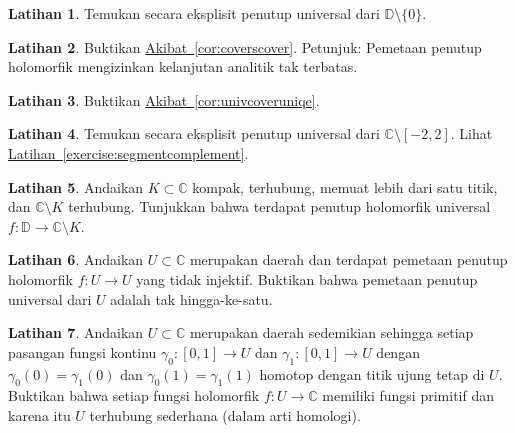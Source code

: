 \documentclass[12pt,openany]{book}
\newcommand{\C}{{\mathbb{C}}}
\newcommand{\D}{{\mathbb{D}}}
\theoremstyle{plain}
\theoremstyle{remark}
\theoremstyle{definition}
\newenvironment{exbox}{%
    \def\FrameCommand{\vrule width 1pt \relax\hspace{10pt}}%
    \MakeFramed{\advance\hsize-\width\FrameRestore}%
}{%
    \endMakeFramed
}
\theoremstyle{exercise}
\newtheorem{exercise}{Latihan}[section]
\theoremstyle{example}
\newcommand{\exerciseref}[1]{\hyperref[#1]{Latihan~\ref*{#1}}}
\newcommand{\corref}[1]{\hyperref[#1]{Akibat~\ref*{#1}}}
\begin{document}
\begin{exbox}
\begin{exercise}
Temukan secara eksplisit penutup universal dari $\D \setminus \{ 0 \}$.
\end{exercise}

\begin{exercise}
Buktikan \corref{cor:coverscover}.  Petunjuk: Pemetaan penutup holomorfik
mengizinkan kelanjutan analitik tak terbatas.
\end{exercise}

\begin{exercise}
Buktikan \corref{cor:univcoveruniqe}.
\end{exercise}

\begin{exercise}
Temukan secara eksplisit penutup universal dari $\C \setminus [-2,2]$.
Lihat \exerciseref{exercise:segmentcomplement}.
\end{exercise}

\begin{exercise}
Andaikan $K \subset \C$ kompak, terhubung, memuat lebih dari satu
titik, dan $\C \setminus K$ terhubung.  Tunjukkan bahwa
terdapat penutup holomorfik universal $f \colon \D \to \C \setminus K$.
\end{exercise}

\begin{exercise}
Andaikan $U \subset \C$ merupakan daerah dan terdapat
pemetaan penutup holomorfik
$f \colon U \to U$ yang tidak injektif.
Buktikan bahwa pemetaan penutup universal dari $U$ adalah tak hingga-ke-satu.
\end{exercise}

\begin{exercise} \label{exercise:EPHimpliesSC}
Andaikan $U \subset \C$ merupakan daerah sedemikian sehingga 
setiap pasangan fungsi kontinu 
$\gamma_0 \colon [0,1] \to U$ dan
$\gamma_1 \colon [0,1] \to U$
dengan
$\gamma_0(0)=\gamma_1(0)$ dan
$\gamma_0(1)=\gamma_1(1)$ homotop dengan titik ujung tetap di $U$.
Buktikan bahwa setiap fungsi holomorfik $f \colon U \to \C$ memiliki fungsi primitif
dan karena itu $U$ terhubung sederhana (dalam arti homologi).
\end{exercise}
\end{exbox}

\end{document}
